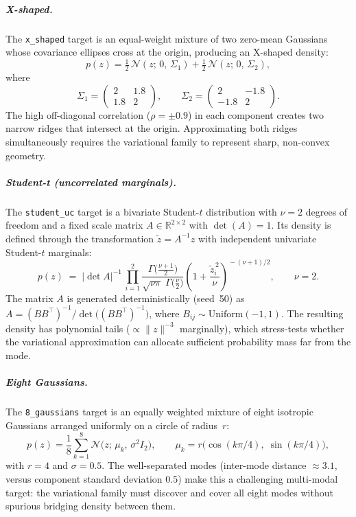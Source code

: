 \subparagraph{X-shaped.}
The \texttt{x\_shaped} target is an equal-weight mixture of two zero-mean Gaussians whose covariance ellipses cross at the origin, producing an X-shaped density:
\begin{equation}\label{eq:x-shaped}
  p(z) = \tfrac{1}{2}\,\mathcal{N}(z;\,0,\,\Sigma_1)
        + \tfrac{1}{2}\,\mathcal{N}(z;\,0,\,\Sigma_2),
\end{equation}
where
\[
  \Sigma_1 = \begin{pmatrix} 2 & 1.8 \\ 1.8 & 2 \end{pmatrix},
  \qquad
  \Sigma_2 = \begin{pmatrix} 2 & -1.8 \\ -1.8 & 2 \end{pmatrix}.
\]
The high off-diagonal correlation ($\rho = \pm 0.9$) in each component creates two narrow ridges that intersect at the origin.  Approximating both ridges simultaneously requires the variational family to represent sharp, non-convex geometry.

\subparagraph{Student-t (uncorrelated marginals).}
The \texttt{student\_uc} target is a bivariate Student-$t$ distribution with $\nu=2$ degrees of freedom and a fixed scale matrix $A\in\mathbb{R}^{2\times 2}$ with $\det(A)=1$.  Its density is defined through the transformation $\tilde{z} = A^{-1}z$ with independent univariate Student-$t$ marginals:
\begin{equation}\label{eq:student-uc}
  p(z) \;=\; |\!\det A|^{-1}\,\prod_{i=1}^{2}
    \frac{\Gamma\!\bigl(\tfrac{\nu+1}{2}\bigr)}
         {\sqrt{\nu\pi}\;\Gamma\!\bigl(\tfrac{\nu}{2}\bigr)}
    \left(1 + \frac{\tilde{z}_i^{\,2}}{\nu}\right)^{\!-(\nu+1)/2},
  \qquad \nu = 2.
\end{equation}
The matrix $A$ is generated deterministically (seed~50) as $A = (B B^\top)^{-1}/\det\bigl((B B^\top)^{-1}\bigr)$, where $B_{ij}\sim\mathrm{Uniform}(-1,1)$.  The resulting density has polynomial tails ($\propto\|z\|^{-3}$ marginally), which stress-tests whether the variational approximation can allocate sufficient probability mass far from the mode.

\subparagraph{Eight Gaussians.}
The \texttt{8\_gaussians} target is an equally weighted mixture of eight isotropic Gaussians arranged uniformly on a circle of radius~$r$:
\begin{equation}\label{eq:8-gaussians}
  p(z) = \frac{1}{8}\sum_{k=1}^{8}
    \mathcal{N}\!\bigl(z;\,\mu_k,\,\sigma^2 I_2\bigr),
  \qquad
  \mu_k = r\bigl(\cos(k\pi/4),\;\sin(k\pi/4)\bigr),
\end{equation}
with $r=4$ and $\sigma=0.5$.  The well-separated modes (inter-mode distance $\approx 3.1$, versus component standard deviation $0.5$) make this a challenging multi-modal target: the variational family must discover and cover all eight modes without spurious bridging density between them.

